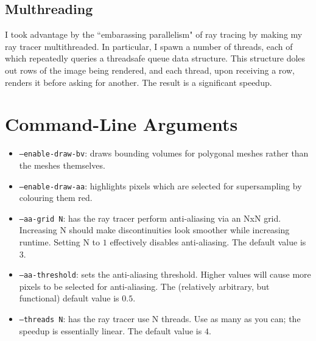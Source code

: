 \documentclass{article}
\begin{document}
\subsection{Multhreading}

I took advantage by the ``embarassing parallelism" of ray tracing by making my
ray tracer multithreaded. In particular, I spawn a number of threads, each of
which repeatedly queries a threadsafe queue data structure. This structure doles
out rows of the image being rendered, and each thread, upon receiving a row,
renders it before asking for another. The result is a significant speedup.

\section{Command-Line Arguments}

\begin{itemize}

  \item {\tt --enable-draw-bv}: draws bounding volumes for polygonal meshes rather
    than the meshes themselves.

  \item {\tt --enable-draw-aa}: highlights pixels which are selected for
    supersampling by colouring them red.

  \item {\tt --aa-grid N}: has the ray tracer perform anti-aliasing via an NxN
    grid. Increasing N should make discontinuities look smoother while
    increasing runtime. Setting N to $1$ effectively disables anti-aliasing. The
    default value is $3$.

  \item {\tt --aa-threshold}: sets the anti-aliasing threshold. Higher values
    will cause more pixels to be selected for anti-aliasing. The (relatively
    arbitrary, but functional) default value is $0.5$.

  \item {\tt --threads N}: has the ray tracer use N threads. Use as many as you
    can; the speedup is essentially linear. The default value is $4$.

\end{itemize}
\end{document}
